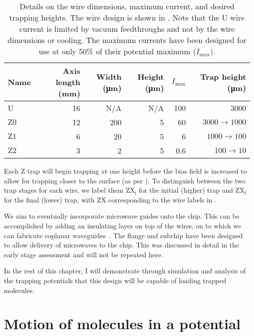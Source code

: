%
\begin{table}
  \centering
\begin{tabular}{lrrrrr}
  Name & Axis length (\si{\milli\meter}) & Width (\si{\micro\meter})& Height
  (\si{\micro\meter})& $I_\text{max}$ & Trap height (\si{\micro\meter}) \\
 \hline
  U & 16 & N/A& N/A& 100 & 3000\\
  $\mathrm{Z0}$ & 12 & 200&  5& 60& $3000\rightarrow1000$ \\
  $\mathrm{Z1}$ &  6 & 20&  5& 6& $1000\rightarrow100$ \\
  $\mathrm{Z2}$ &  3 & 2&  5& 0.6& $100\rightarrow10$ \\
 \hline
\end{tabular}
  \caption{Details on the wire dimensions, maximum current, and desired
  trapping heights. The wire design is shown in
  . Note that the U wire current is
  limited by vacuum feedthroughs and not by the wire dimensions or cooling.
  The maximum currents have been designed for use at only 50\% of their
  potential maximum ($I_\text{max}$).
  }
  \label{design:table:wires}
\end{table}

Each Z trap will begin trapping at one height before the bias field is
increased to allow for trapping closer to the surface (as per
).  To distinguish between the two trap stages for
each wire, we label them $\mathrm{ZX_i}$ for the initial (higher) trap and
$\mathrm{ZX_f}$ for the final (lower) trap, with $\mathrm{ZX}$ corresponding to
the wire labels in .

We aim to eventually incorporate microwave guides onto the chip. This can be
accomplished by adding an insulating layer on top of the wires, on to which we
can fabricate coplanar waveguides~\cite{1127105}. The flange and subchip have
been designed to allow delivery of microwaves to the chip.  This was discussed in detail in the early stage
assessment and will not be repeated here.

In the rest of this chapter, I will demonstrate through simulation and analysis
of the trapping potentials that this design will be capable of loading trapped
\CaF{} molecules.

\section{Motion of molecules in a potential}
\label{design:motion}

